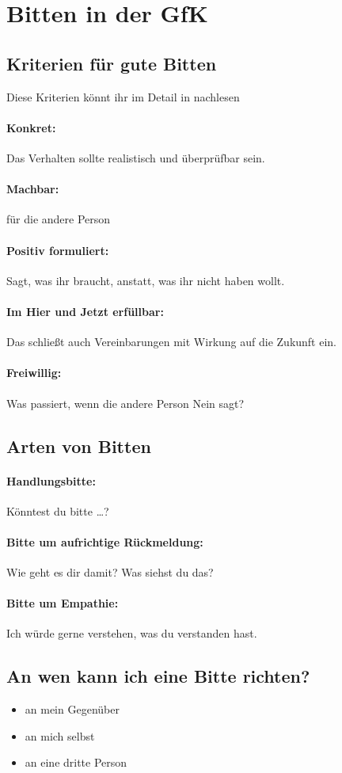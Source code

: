 \section{Bitten in der GfK}
\label{bitten}

\subsection{Kriterien für gute Bitten}

Diese Kriterien könnt ihr im Detail in \cite[S.~85~f]{gfk-dummies} nachlesen

\paragraph{Konkret:} Das Verhalten sollte realistisch und überprüfbar sein.

\paragraph{Machbar:} für die andere Person

\paragraph{Positiv formuliert:} Sagt, was ihr braucht, anstatt, was ihr nicht haben wollt.

\paragraph{Im Hier und Jetzt erfüllbar:} Das schließt auch Vereinbarungen mit Wirkung auf die Zukunft ein.

\paragraph{Freiwillig:} Was passiert, wenn die andere Person Nein sagt?


\subsection{Arten von Bitten}

\paragraph{Handlungsbitte:} Könntest du bitte \ldots?

\paragraph{Bitte um aufrichtige Rückmeldung:} Wie geht es dir damit? Was siehst du das?

\paragraph{Bitte um Empathie:} Ich würde gerne verstehen, was du verstanden hast.


\subsection{An wen kann ich eine Bitte richten?}

\begin{itemize}
  \item an mein Gegenüber
  \item an mich selbst
  \item an eine dritte Person
\end{itemize}

